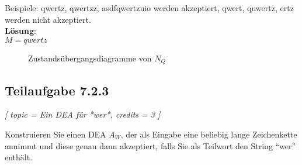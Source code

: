 \documentclass[12pt]{article}
\begin{document}
 Beispiele: qwertz, qwertzz, asdfqwertzuio werden akzeptiert, qwert, quwertz, ertz werden nicht akzeptiert.  \\
  
   \textbf{Lösung}:\\
 $M = qwertz$
  \begin{figure}[h] 
 \centering 
  
 \caption{Zustandsübergangsdiagramme von $N_{Q}$} 
 \label{A234} 
 \end{figure} 
 
  
  
 \subsection*{Teilaufgabe 7.2.3} 
\textit{[ 
 topic = Ein DEA für *wer*, 
 credits = 3 
 ] }
  
 Konstruieren Sie einen DEA $A_W$, der als Eingabe eine beliebig lange Zeichenkette annimmt und diese genau dann akzeptiert, falls Sie als Teilwort den String "`wer"' enthält. 
  
\end{document}
